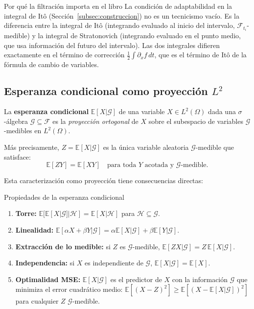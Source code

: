 \begin{observacion}{Por qué la filtración importa en el libro}
La condición de adaptabilidad en la integral de Itô (Sección~\ref{subsec:construccion})
no es un tecnicismo vacío. Es la diferencia entre la integral de Itô (integrando
evaluado al inicio del intervalo, $\mathcal{F}_{t_i}$-medible) y la integral de
Stratonovich (integrando evaluado en el punto medio, que usa información del
futuro del intervalo). Las dos integrales difieren exactamente en el término de
corrección $\frac{1}{2}\int\partial_x f\,dt$, que es el término de Itô de la
fórmula de cambio de variables.
\end{observacion}

\subsection{Esperanza condicional como proyección $L^2$}
\label{subsec:ap_esperanza_cond}

La \textbf{esperanza condicional} $\mathbb{E}[X|\mathcal{G}]$ de una variable
$X\in L^2(\Omega)$ dada una $\sigma$-álgebra $\mathcal{G}\subseteq\mathcal{F}$
es la \emph{proyección ortogonal} de $X$ sobre el subespacio de variables
$\mathcal{G}$-medibles en $L^2(\Omega)$.

Más precisamente, $Z = \mathbb{E}[X|\mathcal{G}]$ es la única variable aleatoria
$\mathcal{G}$-medible que satisface:
\begin{equation}
  \mathbb{E}[ZY] = \mathbb{E}[XY]
  \quad\text{para toda }Y\text{ acotada y }\mathcal{G}\text{-medible}.
  \label{eq:ap_ec_proyeccion}
\end{equation}

Esta caracterización como proyección tiene consecuencias directas:

\begin{proposicion}{Propiedades de la esperanza condicional}
\label{prop:ap_ec}
\begin{enumerate}
  \item \textbf{Torre:} $\mathbb{E}[\mathbb{E}[X|\mathcal{G}]|\mathcal{H}]
        = \mathbb{E}[X|\mathcal{H}]$ para $\mathcal{H}\subseteq\mathcal{G}$.
  \item \textbf{Linealidad:} $\mathbb{E}[\alpha X + \beta Y|\mathcal{G}]
        = \alpha\mathbb{E}[X|\mathcal{G}] + \beta\mathbb{E}[Y|\mathcal{G}]$.
  \item \textbf{Extracción de lo medible:} si $Z$ es $\mathcal{G}$-medible,
        $\mathbb{E}[ZX|\mathcal{G}] = Z\,\mathbb{E}[X|\mathcal{G}]$.
  \item \textbf{Independencia:} si $X$ es independiente de $\mathcal{G}$,
        $\mathbb{E}[X|\mathcal{G}] = \mathbb{E}[X]$.
  \item \textbf{Optimalidad MSE:} $\mathbb{E}[X|\mathcal{G}]$ es el predictor
        de $X$ con la información $\mathcal{G}$ que minimiza el error cuadrático
        medio: $\mathbb{E}[(X-Z)^2]\geq\mathbb{E}[(X-\mathbb{E}[X|\mathcal{G}])^2]$
        para cualquier $Z$ $\mathcal{G}$-medible.
\end{enumerate}
\end{proposicion}

